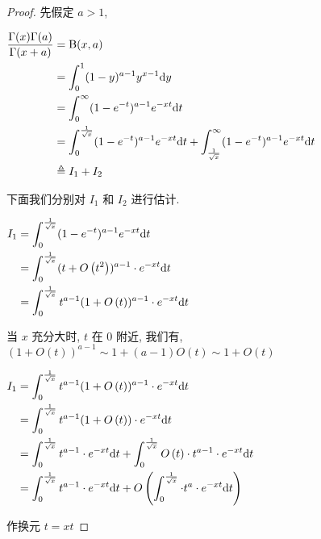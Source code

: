 \begin{proof}
	先假定 $a>1$,

	\begin{center}
		$
		\begin{aligned}
			\dfrac{\Gamma(x)\Gamma(a)}{\Gamma(x+a)} &=\text {B}(x,a) \\
			&= \int_0^1 (1-y)^{a-1}y^{x-1} \text {d} y \\
			&= \int_0^\infty (1-e^{-t})^{a-1}e^{-xt}\text {d} t\\
			&=\int_0^{\frac 1 {\sqrt{x}}} (1-e^{-t})^{a-1}e^{-xt}\text {d} t+\int_{\frac 1 {\sqrt{x}}}^\infty (1-e^{-t})^{a-1}e^{-xt}\text {d} t \\
			&\triangleq I_1+I_2
		\end{aligned}
		$
	\end{center}

	下面我们分别对 $I_1$ 和 $I_2$ 进行估计.

	\begin{center}
		$
		\begin{aligned}
			I_1 &=\int_0^{\frac 1 {\sqrt{x}}} (1-e^{-t})^{a-1}e^{-xt}\text {d} t \\
			&= \int_0^{\frac 1 {\sqrt x}} (t+O\left(t^2\right))^{a-1} \cdot e^{-xt} \text {d} t\\
			&= \int_0^{\frac 1 {\sqrt x}} t^{a-1}(1+O\left(t\right))^{a-1}\cdot e^{-xt}\text {d} t
		\end{aligned}
		$
	\end{center}

	当 $x$ 充分大时, $t$ 在 $0$ 附近, 我们有, $(1+O\left(t\right))^{a-1}\sim 1+(a-1)O\left(t\right)\sim 1+O\left(t\right)$

	\begin{center}
		$
		\begin{aligned}
			I_1 &=\int_0^{\frac 1 {\sqrt x}} t^{a-1}(1+O\left(t\right))^{a-1}\cdot e^{-xt}\text {d} t \\
			&= \int_0^{\frac 1 {\sqrt x}} t^{a-1}(1+O\left(t\right))\cdot e^{-xt}\text {d} t \\
			&= \int_0^{\frac 1 {\sqrt x}} t^{a-1}\cdot e^{-xt} \text {d} t + \int_0^{\frac 1 {\sqrt x}} O\left(t\right)\cdot t^{a-1}\cdot e^{-xt}\text {d} t \\
			&=\int_0^{\frac 1 {\sqrt x}} t^{a-1}\cdot e^{-xt} \text {d} t +O\left(\int_0^{\frac 1 {\sqrt x}}\cdot t^a\cdot e^{-xt}\text {d} t\right)
		\end{aligned}
		$
	\end{center}

	作换元 $t=xt$


\end{proof}

